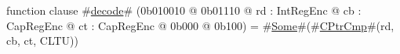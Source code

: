 function clause #\hyperref[zdecode]{decode}# (0b010010 @ 0b01110 @ rd : IntRegEnc @ cb : CapRegEnc @ ct : CapRegEnc @ 0b000 @ 0b100) = #\hyperref[zSome]{Some}#(#\hyperref[zCPtrCmp]{CPtrCmp}#(rd, cb, ct, CLTU))
